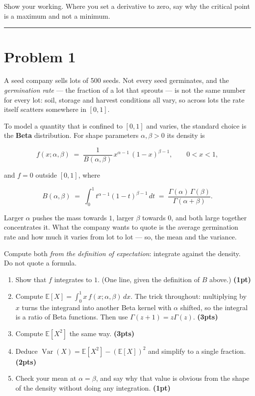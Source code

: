 \documentclass[11pt,a4paper]{article}
\newcommand{\pts}[1]{\hfill\textbf{(#1pts)}}
\newcommand{\pt}[1]{\hfill\textbf{(#1pt)}}
\newcommand{\EE}{\mathbb{E}}
\newcommand{\Var}{\operatorname{Var}}
\newenvironment{parts}
  {\begin{enumerate}\setlength{\itemsep}{0.45em}\setlength{\parskip}{0pt}}
  {\end{enumerate}}
\begin{document}
\medskip
\noindent
Show your working. Where you set a derivative to zero, say why the critical point
is a maximum and not a minimum.

\bigskip
\hrule
\bigskip

\section*{Problem 1}

A seed company sells lots of 500 seeds. Not every seed germinates, and the
\emph{germination rate} — the fraction of a lot that sprouts — is not the same
number for every lot: soil, storage and harvest conditions all vary, so across
lots the rate itself scatters somewhere in $[0,1]$.

To model a quantity that is confined to $[0,1]$ and varies, the standard choice is
the \textbf{Beta} distribution. For shape parameters $\alpha, \beta > 0$ its
density is

\[
  f(x; \alpha, \beta) \;=\; \frac{1}{B(\alpha,\beta)}\,
  x^{\alpha - 1}\,(1-x)^{\beta - 1},
  \qquad 0 < x < 1,
\]

and $f = 0$ outside $[0,1]$, where

\[
  B(\alpha,\beta) \;=\; \int_0^1 t^{\alpha-1}(1-t)^{\beta-1}\,dt
  \;=\; \frac{\Gamma(\alpha)\,\Gamma(\beta)}{\Gamma(\alpha+\beta)} .
\]

Larger $\alpha$ pushes the mass towards $1$, larger $\beta$ towards $0$, and both
large together concentrates it. What the company wants to quote is the average
germination rate and how much it varies from lot to lot — so, the mean and the
variance.

Compute both \emph{from the definition of expectation}: integrate against the
density. Do not quote a formula.

\begin{parts}
  \item Show that $f$ integrates to $1$. (One line, given the definition of
        $B$ above.) \pt{1}
  \item Compute $\EE[X] = \int_0^1 x\,f(x;\alpha,\beta)\,dx$. The trick
        throughout: multiplying by $x$ turns the integrand into another Beta
        kernel with $\alpha$ shifted, so the integral is a ratio of Beta
        functions. Then use $\Gamma(z+1) = z\Gamma(z)$. \pts{3}
  \item Compute $\EE[X^2]$ the same way. \pts{3}
  \item Deduce $\Var(X) = \EE[X^2] - (\EE[X])^2$ and simplify to a single
        fraction. \pts{2}
  \item Check your mean at $\alpha = \beta$, and say why that value is obvious
        from the shape of the density without doing any integration. \pt{1}
\end{parts}
\end{document}
